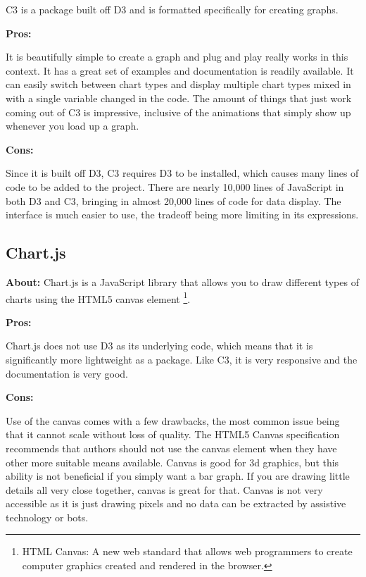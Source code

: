 \documentclass[draftclsnofoot,onecolumn,letterpaper,10pt,compsoc]{IEEEtran}
\begin{document}
    C3 is a package built off D3 and is formatted specifically for creating graphs.

    \noindent \textbf{Pros:}

    It is beautifully simple to create a graph and plug and play really works in this context.
    It has a great set of examples and documentation is readily available.
    It can easily switch between chart types and display multiple chart types mixed in with a single variable changed in the code.\cite{c3.org}
    The amount of things that just work coming out of C3 is impressive, inclusive of the animations that simply show up whenever you load up a graph.

    \noindent \textbf{Cons:}

    Since it is built off D3, C3 requires D3 to be installed, which causes many lines of code to be added to the project.
    There are nearly 10,000 lines of JavaScript in both D3 and C3, bringing in almost 20,000 lines of code for data display.
    The interface is much easier to use, the tradeoff being more limiting in its expressions.


    \subsection{Chart.js}
    \textbf{About:}
    Chart.js is a JavaScript library that allows you to draw different types of charts using the HTML5 canvas element
    \footnote{HTML Canvas: A new web standard that allows web programmers to create computer graphics created and rendered in the browser.}.

    \noindent \textbf{Pros:}

    Chart.js does not use D3 as its underlying code, which means that it is significantly more lightweight as a package.\cite{ChartJS} Like C3, it is very responsive and the documentation is very good.

    \noindent \textbf{Cons:}

    Use of the canvas comes with a few drawbacks, the most common issue being that it cannot scale without loss of quality.
    The HTML5 Canvas specification recommends that authors should not use the canvas element when they have other more suitable means available.\cite{CanvasVsSVG}
    Canvas is good for 3d graphics, but this ability is not beneficial if you simply want a bar graph.
    If you are drawing little details all very close together, canvas is great for that.
    Canvas is not very accessible as it is just drawing pixels and no data can be extracted by assistive technology or bots.
\end{document}

